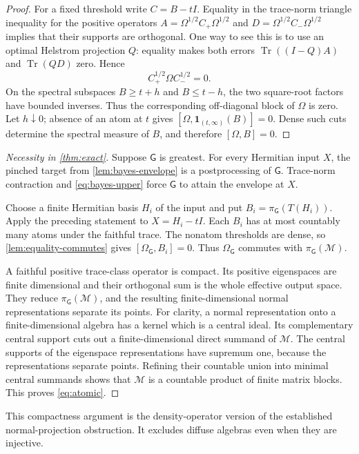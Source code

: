 \documentclass[11pt,reqno]{amsart}
\theoremstyle{definition}
\theoremstyle{remark}
\numberwithin{equation}{section}
\DeclareMathOperator{\Tr}{Tr}
\newcommand{\M}{\mathcal M}
\newcommand{\G}{\mathsf G}
\newcommand{\one}{\mathbf 1}
\begin{document}
\begin{proof}
For a fixed threshold write $C=B-tI$. Equality in the trace-norm triangle inequality for the positive operators $A=\Omega^{1/2}C_+\Omega^{1/2}$ and $D=\Omega^{1/2}C_-\Omega^{1/2}$ implies that their supports are orthogonal. One way to see this is to use an optimal Helstrom projection $Q$: equality makes both errors $\Tr((I-Q)A)$ and $\Tr(QD)$ zero. Hence
\[
 C_+^{1/2}\Omega C_-^{1/2}=0.
\]
On the spectral subspaces $B\ge t+h$ and $B\le t-h$, the two square-root factors have bounded inverses. Thus the corresponding off-diagonal block of $\Omega$ is zero. Let $h\downarrow0$; absence of an atom at $t$ gives $[\Omega,\one_{(t,\infty)}(B)]=0$. Dense such cuts determine the spectral measure of $B$, and therefore $[\Omega,B]=0$.
\end{proof}

\begin{proof}[Necessity in \cref{thm:exact}]
Suppose $\G$ is greatest. For every Hermitian input $X$, the pinched target from \cref{lem:bayes-envelope} is a postprocessing of $\G$. Trace-norm contraction and \eqref{eq:bayes-upper} force $\G$ to attain the envelope at $X$.

Choose a finite Hermitian basis $H_i$ of the input and put $B_i=\pi_\G(T(H_i))$. Apply the preceding statement to $X=H_i-tI$. Each $B_i$ has at most countably many atoms under the faithful trace. The nonatom thresholds are dense, so \cref{lem:equality-commutes} gives $[\Omega_\G,B_i]=0$. Thus $\Omega_\G$ commutes with $\pi_\G(\M)$.

A faithful positive trace-class operator is compact. Its positive eigenspaces are finite dimensional and their orthogonal sum is the whole effective output space. They reduce $\pi_\G(\M)$, and the resulting finite-dimensional normal representations separate its points. For clarity, a normal representation onto a finite-dimensional algebra has a kernel which is a central ideal. Its complementary central support cuts out a finite-dimensional direct summand of $\M$. The central supports of the eigenspace representations have supremum one, because the representations separate points. Refining their countable union into minimal central summands shows that $\M$ is a countable product of finite matrix blocks. This proves \eqref{eq:atomic}.
\end{proof}

This compactness argument is the density-operator version of the established normal-projection obstruction. It excludes diffuse algebras even when they are injective.
\end{document}
